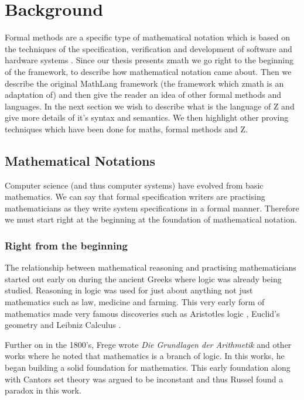 \chapter{Background}
\label{ch:background}

Formal methods are a specific type of mathematical notation which is based on the techniques of the specification, verification and development of software and hardware systems \cite{whatareformalmethods}. Since our thesis presents \gls{zmath} we go right to the beginning of the framework, to describe how mathematical notation came about. Then we describe the original MathLang framework (the framework which \gls{zmath} is an adaptation of) and then give the reader an idea of other formal methods and languages. In the next section we wish to describe what is the language of Z and give more details of it's syntax and semantics. We then highlight other proving techniques which have been done for maths, formal methods and Z.

\section{Mathematical Notations}

Computer science (and thus computer systems) have evolved from basic mathematics. We can say that formal specification writers are practising mathematicians as they write system specifications in a formal manner. Therefore we must start right at the beginning at the foundation of mathematical notation.

\subsection{Right from the beginning}
\label{subsec:rftb}

The relationship between mathematical reasoning and practising mathematicians started out early on during the ancient Greeks where logic was already being studied. Reasoning in logic was used for just about anything not just mathematics such as law, medicine and farming. This very early form of mathematics made very famous discoveries such as Aristotles logic \cite{aristotle}, Euclid's geometry \cite{euclid} and Leibniz Calculus \cite{leibniz}.

Further on in the 1800's, Frege wrote \emph{Die Grundlagen der Arithmetik} \cite{frege} and other works where he noted that mathematics is a branch of logic. In this works, he began building a solid foundation for mathematics. This early foundation along with Cantors set theory \cite{cantor} was argued to be inconstant and thus Russel found a paradox in this work.

